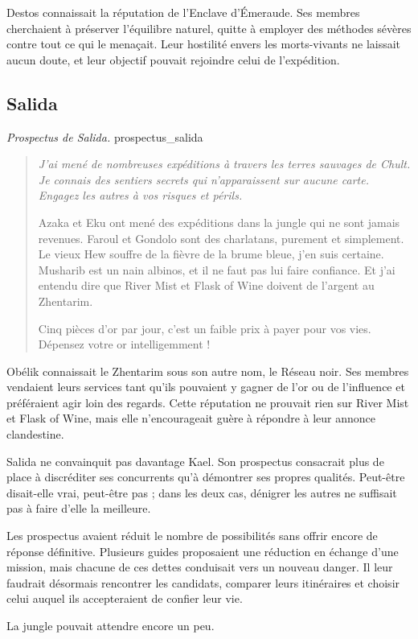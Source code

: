 Destos connaissait la réputation de l'Enclave d'Émeraude. Ses membres cherchaient à préserver l'équilibre naturel, quitte à employer des méthodes sévères contre tout ce qui le menaçait. Leur hostilité envers les morts-vivants ne laissait aucun doute, et leur objectif pouvait rejoindre celui de l'expédition.

\subsection*{Salida}

{\textit{Prospectus de Salida.}}
{prospectus_salida}

\begin{quote}\itshape
J'ai mené de nombreuses expéditions à travers les terres sauvages de Chult. Je connais des sentiers secrets qui n'apparaissent sur aucune carte. Engagez les autres à vos risques et périls.

Azaka et Eku ont mené des expéditions dans la jungle qui ne sont jamais revenues. Faroul et Gondolo sont des charlatans, purement et simplement. Le vieux Hew souffre de la fièvre de la brume bleue, j'en suis certaine. Musharib est un nain albinos, et il ne faut pas lui faire confiance. Et j'ai entendu dire que River Mist et Flask of Wine doivent de l'argent au Zhentarim.

Cinq pièces d'or par jour, c'est un faible prix à payer pour vos vies. Dépensez votre or intelligemment !
\end{quote}

Obélik connaissait le Zhentarim sous son autre nom, le Réseau noir. Ses membres vendaient leurs services tant qu'ils pouvaient y gagner de l'or ou de l'influence et préféraient agir loin des regards. Cette réputation ne prouvait rien sur River Mist et Flask of Wine, mais elle n'encourageait guère à répondre à leur annonce clandestine.

Salida ne convainquit pas davantage Kael. Son prospectus consacrait plus de place à discréditer ses concurrents qu'à démontrer ses propres qualités. Peut-être disait-elle vrai, peut-être pas ; dans les deux cas, dénigrer les autres ne suffisait pas à faire d'elle la meilleure.

Les prospectus avaient réduit le nombre de possibilités sans offrir encore de réponse définitive. Plusieurs guides proposaient une réduction en échange d'une mission, mais chacune de ces dettes conduisait vers un nouveau danger. Il leur faudrait désormais rencontrer les candidats, comparer leurs itinéraires et choisir celui auquel ils accepteraient de confier leur vie.

La jungle pouvait attendre encore un peu.
